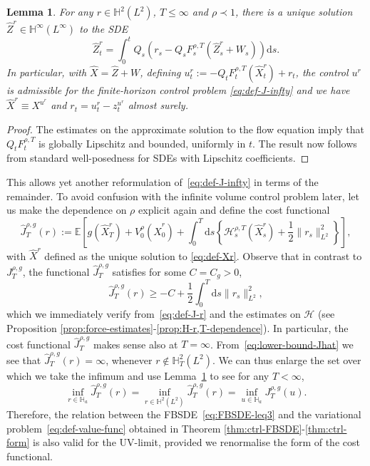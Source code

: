 \documentclass[11pt, a4paper]{scrartcl}
\numberwithin{equation}{section}
\theoremstyle{plain}
\newtheorem{lemma}[foo]{Lemma}
\theoremstyle{remark}
\newcommand{\assign}{:=}
\newcommand{\mathd}{\mathrm{d}}
\newcommand{\nin}{\not\in}
\begin{document}
\begin{lemma}
  \label{lem:u(r)}For any $r \in \mathbb{H}^2 (L^2)$, $T \leqslant \infty$ and
  $\rho \prec 1$, there is a unique solution $\hat{Z}^r \in \mathbb{H}^{\infty}
  (L^{\infty})$ to the SDE
  \begin{equation}
    \hat{Z}^r_t = \int_0^t Q_s (r_s - Q_s F^{\rho, T}_s (\hat{Z}^r_s + W_s))
    \mathd s. \label{eq:def-Xr}
  \end{equation}
  In particular, with $\hat{X} = \hat{Z} + W$, defining $u^r_t \assign - Q_t
  F^{\rho, T}_t (\hat{X}^r_t) + r_t$, the control $u^r$ is admissible for the
  finite-horizon control problem \eqref{eq:def-J-infty} and we have $\hat{X}^r
  \equiv X^{u^r}$ and $r_t = u^r_t - z_t^{u^r}$ almost surely.
\end{lemma}

\begin{proof}
  The estimates on the approximate solution to the flow equation imply that
  $Q_t F_t^{\rho, T}$ is globally Lipschitz and bounded, uniformly in $t$. The
  result now follows from standard well-posedness for SDEs with Lipschitz
  coefficients.
\end{proof}

This allows yet another reformulation of~\eqref{eq:def-J-infty} in terms of
the remainder. To avoid confusion with the infinite volume control problem
later, let us make the dependence on $\rho$ explicit again and define the cost
functional
\begin{equation}
  \hat{J}_T^{\rho, g} (r) \assign \mathbb{E} \left[ g (\hat{X}_T^r) +
  V^{\rho}_0 (\hat{X}_0^r) + \int_0^T \mathd s \left\{ \mathcal{H}^{\rho, T}_s
  (\hat{X}_s^r) + \frac{1}{2} \| r_s \|^2_{L^2} \right\} \right]
  \label{eq:def-J-r},
\end{equation}
with $\hat{X}^r$ defined as the unique solution to \eqref{eq:def-Xr}. Observe
that in contrast to $J^{\rho, g}_T$, the functional $\hat{J}^{\rho, g}_T$
satisfies for some $C = C_g > 0$,
\begin{equation}
  \hat{J}^{\rho, g}_T (r) \geqslant - C + \frac{1}{2}  \int_0^T \mathd s \|
  r_s \|^2_{L^2}, \label{eq:lower-bound-Jhat}
\end{equation}
which we immediately verify from~\eqref{eq:def-J-r} and the estimates on
$\mathcal{H}$ (see Proposition
\ref{prop:force-estimates}-\ref{prop:H-r,T-dependence}). In particular, the
cost functional $\hat{J}_T^{\rho, g}$ makes sense also at $T = \infty$.
From~\eqref{eq:lower-bound-Jhat} we see that $\hat{J}^{\rho, g}_T (r) =
\infty$, whenever $r \nin \mathbb{H}^2_T (L^2)$. We can thus enlarge the set
over which we take the infimum and use Lemma~\ref{lem:u(r)} to see
for any $T < \infty$,
\[ \inf_{r \in \mathbb{H}_a}  \hat{J}_T^{\rho, g} (r) = \inf_{r \in
   \mathbb{H}^2 (L^2)}  \hat{J}_T^{\rho, g} (r) = \inf_{u \in \mathbb{H}_a}
   J^{\rho, g}_T (u) . \]
Therefore, the relation between the FBSDE~\eqref{eq:FBSDE-leq3} and the variational
problem~\eqref{eq:def-value-func} obtained in Theorem
\ref{thm:ctrl-FBSDE}-\ref{thm:ctrl-form} is also valid for the UV-limit,
provided we renormalise the form of the cost functional.
\end{document}
